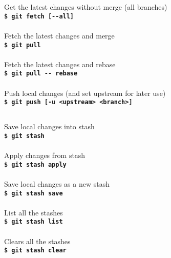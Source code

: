 \documentclass[12pt,a3paper,margin=4pt,landscape]{article}
\newcommand{\cmd}[2]{
	#1\\
	\texttt{\textbf{\$ git #2}}\\
	\\
}
\newcommand{\cmdnoline}[2]{
	#1\\
	\texttt{\textbf{\$ git #2}}
}
\newcommand{\sect}[2]{
	\section*{\color{#1}{#2}}
}
\begin{document}
\begin{multicols}{4}


\sect{Orange}{Synchronize}

\cmd{Get the latest changes without merge (all branches)}{fetch [-{}-all]}
\cmd{Fetch the latest changes and merge}{pull}
\cmd{Fetch the latest changes and rebase}{pull -{}- rebase}
\cmdnoline{Push local changes (and set upstream for later use)}{push [-u <upstream> <branch>]}

\begin{adjustwidth}{0.5\columnwidth}{0pt}
\sect{BrickRed}{Stash}
\cmd{Save local changes into stash}{stash}
\cmd{Apply changes from stash}{stash apply}
\cmd{Save local changes as a new stash}{stash save}
\cmd{List all the stashes}{stash list}
\cmd{Clears all the stashes}{stash clear}
\end{adjustwidth}


\end{multicols}
\end{document}
